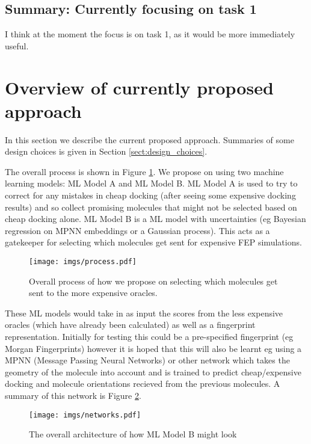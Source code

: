 \documentclass{article}
\begin{document}
\subsection{Summary: Currently focusing on task 1}

I think at the moment the focus is on task 1, as it would be more immediately useful.


\section{Overview of currently proposed approach}
\label{sect:approach}

In this section we describe the current proposed approach.
Summaries of some design choices is given in Section \ref{sect:design_choices}. 

The overall process is shown in Figure \ref{fig:process}. 
We propose on using two machine learning models: ML Model A and ML Model B.
ML Model A is used to try to correct for any mistakes in cheap docking (after seeing some expensive docking results) and so
collect promising molecules that might not be selected based on cheap docking alone.
ML Model B is a ML model with uncertainties (eg  Bayesian regression on MPNN embeddings or a Gaussian process).
This acts as a gatekeeper for selecting which molecules get sent for expensive FEP simulations.

\begin{figure}[t]
\centering
\texttt{[image: imgs/process.pdf]}
\caption{Overall process of how we propose on selecting which molecules get sent to the more expensive oracles.}
\label{fig:process}
\end{figure}

These ML models would take in as input the scores from the less expensive oracles (which have already been calculated) as well as a
fingerprint representation. Initially for testing this could be a pre-specified fingerprint (eg Morgan Fingerprints) however it is hoped
that this will also be learnt eg using a MPNN (Message Passing Neural Networks) or other network which takes the geometry of the molecule into
account and is trained to predict cheap/expensive docking and molecule orientations recieved from the previous molecules.
A summary of this network is Figure \ref{fig:network}.

\begin{figure}[h]
\centering
\texttt{[image: imgs/networks.pdf]}
\caption{The overall architecture of how ML Model B might look}
\label{fig:network}
\end{figure}
\end{document}
